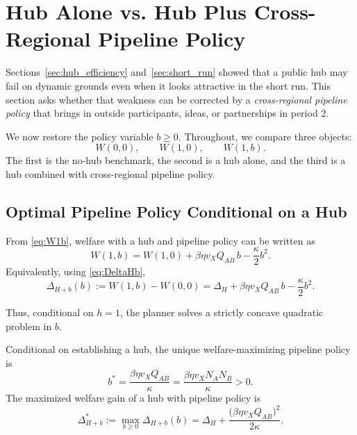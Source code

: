 \section{Hub Alone vs. Hub Plus Cross-Regional Pipeline Policy}
\label{sec:refresh}

Sections~\ref{sec:hub_efficiency} and~\ref{sec:short_run} showed that a public hub may fail on dynamic grounds even when it looks attractive in the short run. This section asks whether that weakness can be corrected by a \emph{cross-regional pipeline policy} that brings in outside participants, ideas, or partnerships in period 2.

We now restore the policy variable $b\ge 0$. Throughout, we compare three objects:
\[
W(0,0), \qquad W(1,0), \qquad W(1,b).
\]
The first is the no-hub benchmark, the second is a hub alone, and the third is a hub combined with cross-regional pipeline policy.

\subsection{Optimal Pipeline Policy Conditional on a Hub}

From \eqref{eq:W1b}, welfare with a hub and pipeline policy can be written as
\begin{equation}
W(1,b)
=
W(1,0)
+
\beta \eta v_X Q_{AB}\, b
-
\frac{\kappa}{2}b^2.
\label{eq:W1b_repeat}
\end{equation}
Equivalently, using \eqref{eq:DeltaHb},
\begin{equation}
\Delta_{H+b}(b)
:=
W(1,b)-W(0,0)
=
\Delta_H
+
\beta \eta v_X Q_{AB}\, b
-
\frac{\kappa}{2}b^2.
\label{eq:DeltaHb_repeat}
\end{equation}

Thus, conditional on $h=1$, the planner solves a strictly concave quadratic problem in $b$.

\begin{proposition}
\label{prop:optimal_refresh}
Conditional on establishing a hub, the unique welfare-maximizing pipeline policy is
\begin{equation}
b^*
=
\frac{\beta \eta v_X Q_{AB}}{\kappa}
=
\frac{\beta \eta v_X N_A N_B}{\kappa}
>0.
\label{eq:bstar}
\end{equation}
The maximized welfare gain of a hub with pipeline policy is
\begin{equation}
\Delta_{H+b}^*
:=
\max_{b\ge 0}\Delta_{H+b}(b)
=
\Delta_H
+
\frac{\bigl(\beta \eta v_X Q_{AB}\bigr)^2}{2\kappa}.
\label{eq:DeltaHb_star}
\end{equation}
\end{proposition}

